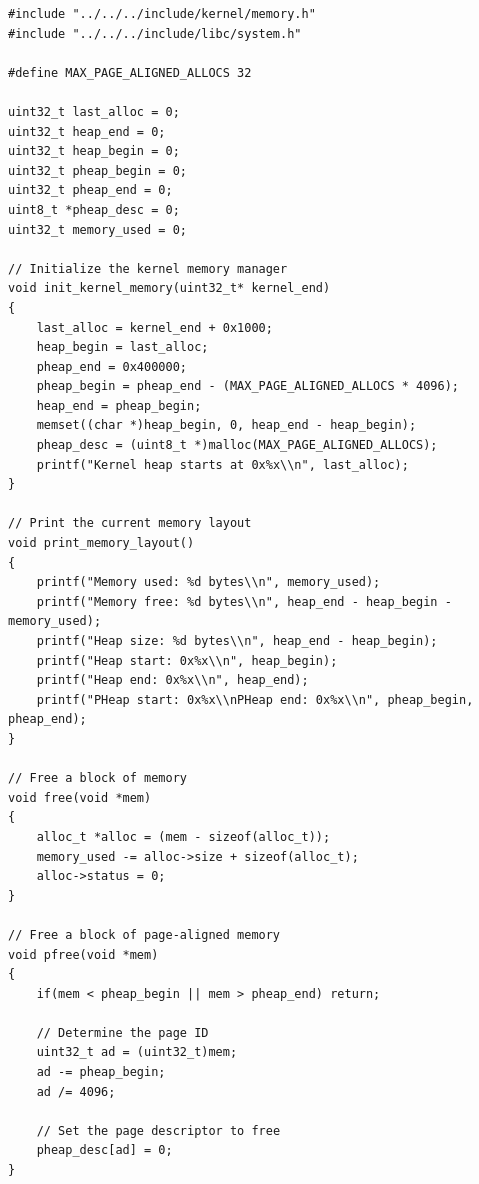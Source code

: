 \documentclass[../main.tex]{subfiles}
\begin{document}
\begin{listing}[H]
    \begin{verbatim}
#include "../../../include/kernel/memory.h"
#include "../../../include/libc/system.h"

#define MAX_PAGE_ALIGNED_ALLOCS 32

uint32_t last_alloc = 0;
uint32_t heap_end = 0;
uint32_t heap_begin = 0;
uint32_t pheap_begin = 0;
uint32_t pheap_end = 0;
uint8_t *pheap_desc = 0;
uint32_t memory_used = 0;

// Initialize the kernel memory manager
void init_kernel_memory(uint32_t* kernel_end)
{
    last_alloc = kernel_end + 0x1000;
    heap_begin = last_alloc;
    pheap_end = 0x400000;
    pheap_begin = pheap_end - (MAX_PAGE_ALIGNED_ALLOCS * 4096);
    heap_end = pheap_begin;
    memset((char *)heap_begin, 0, heap_end - heap_begin);
    pheap_desc = (uint8_t *)malloc(MAX_PAGE_ALIGNED_ALLOCS);
    printf("Kernel heap starts at 0x%x\\n", last_alloc);
}

// Print the current memory layout
void print_memory_layout()
{
    printf("Memory used: %d bytes\\n", memory_used);
    printf("Memory free: %d bytes\\n", heap_end - heap_begin - memory_used);
    printf("Heap size: %d bytes\\n", heap_end - heap_begin);
    printf("Heap start: 0x%x\\n", heap_begin);
    printf("Heap end: 0x%x\\n", heap_end);
    printf("PHeap start: 0x%x\\nPHeap end: 0x%x\\n", pheap_begin, pheap_end);
}

// Free a block of memory
void free(void *mem)
{
    alloc_t *alloc = (mem - sizeof(alloc_t));
    memory_used -= alloc->size + sizeof(alloc_t);
    alloc->status = 0;
}

// Free a block of page-aligned memory
void pfree(void *mem)
{
    if(mem < pheap_begin || mem > pheap_end) return;

    // Determine the page ID
    uint32_t ad = (uint32_t)mem;
    ad -= pheap_begin;
    ad /= 4096;

    // Set the page descriptor to free
    pheap_desc[ad] = 0;
}


\end{verbatim}
\end{listing}
\end{document}
